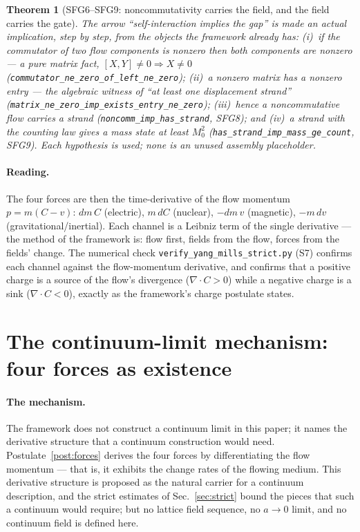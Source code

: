 \documentclass[aps,prd,preprint,superscriptaddress,amsmath,amssymb]{revtex4-2}
\newtheorem{theorem}{Theorem}[section]
\begin{document}
\begin{theorem}[SFG6--SFG9: noncommutativity carries the field, and the field carries the gate]
\label{thm:sfg6}
The arrow ``self-interaction implies the gap'' is made an actual
implication, step by step, from the objects the framework already has:
(i)~if the commutator of two flow components is nonzero then both
components are nonzero --- a pure matrix fact, $[X,Y]\neq0\Rightarrow
X\neq0$ (\texttt{commutator\_ne\_zero\_of\_left\_ne\_zero}); (ii)~a
nonzero matrix has a nonzero entry --- the algebraic witness of ``at
least one displacement strand'' (\texttt{matrix\_ne\_zero\_imp\_exists\_entry\_ne\_zero});
(iii)~hence a noncommutative flow carries a strand
(\texttt{noncomm\_imp\_has\_strand}, SFG8); and (iv)~a strand with the
counting law gives a mass state at least $M_0^2$
(\texttt{has\_strand\_imp\_mass\_ge\_count}, SFG9).  Each hypothesis is
used; none is an unused assembly placeholder.
\end{theorem}

\paragraph{Reading.}  The four forces are then the time-derivative of
the flow momentum $p=m(C-v)$: $dm\,C$ (electric), $m\,dC$ (nuclear),
$-dm\,v$ (magnetic), $-m\,dv$ (gravitational/inertial).  Each channel
is a Leibniz term of the single derivative --- the method of the
framework is: flow first, fields from the flow, forces from the
fields' change.  The numerical check \texttt{verify\_yang\_mills\_strict.py}
(S7) confirms each channel against the flow-momentum derivative, and
confirms that a positive charge is a source of the flow's divergence
($\nabla\cdot C>0$) while a negative charge is a sink
($\nabla\cdot C<0$), exactly as the framework's charge postulate states.

\section{The continuum-limit mechanism: four forces as existence}
\label{sec:continuum}

\paragraph{The mechanism.}
The framework does not construct a continuum limit in this paper; it
names the derivative structure that a continuum construction would
need.  Postulate~\ref{post:forces} derives the four forces by
differentiating the flow momentum --- that is, it exhibits the change
rates of the flowing medium.  This derivative structure is proposed
as the natural carrier for a continuum description, and the strict
estimates of Sec.~\ref{sec:strict} bound the pieces that such a
continuum would require; but no lattice field sequence, no
$a\to0$ limit, and no continuum field is defined here.
\end{document}
